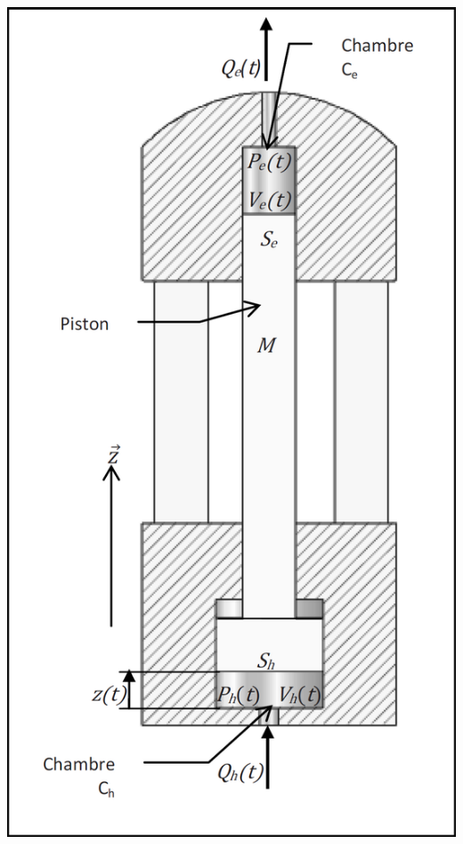 \documentclass[10pt,fleqn]{article} %
\begin{document}
\begin{minipage}[c]{.3\linewidth}
\begin{center}
\includegraphics[width=\linewidth]{images_02/fig_02}
\end{center}
\end{minipage}
\end{document}

